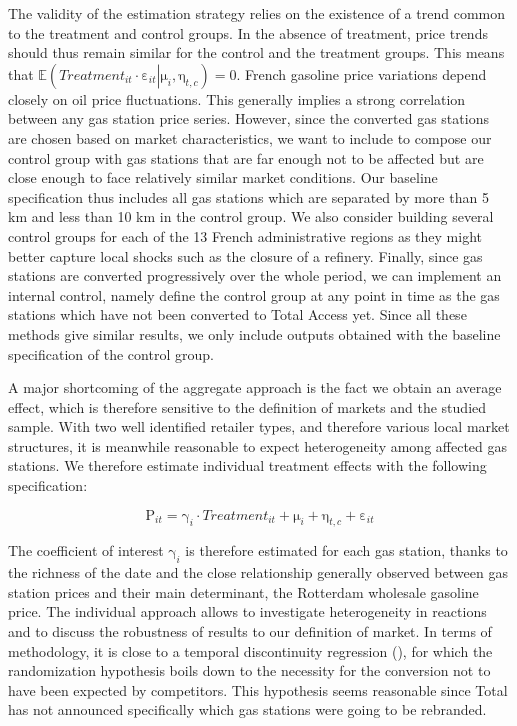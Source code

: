 \documentclass[english]{article}
\begin{document}
The validity of the estimation strategy relies on the existence of a trend common to the treatment and control groups. In the absence of treatment, price trends should thus remain similar for the control and the treatment groups. This means that
$\mathbb{E}\left(Treatment_{it}\cdot\mathrm{\varepsilon}_{it}\left|\mathrm{\mu}_{i},\mathrm{\eta}_{t,c}\right.\right)=0$. French gasoline price variations depend closely on oil price fluctuations. This generally implies a strong correlation between any gas station price series. However, since the converted gas stations are chosen based on market characteristics, we want to include to compose our control group with gas stations that are far enough not to be affected but are close enough to face relatively similar market conditions. Our baseline specification thus includes all gas stations which are separated by more than 5 km and less than 10 km in the control group. We also consider building several control groups for each of the 13 French administrative regions as they might better capture local shocks such as the closure of a refinery. Finally, since gas stations are converted progressively over the whole period, we can implement an internal control, namely define the control group at any point in time as the gas stations which have not been converted to Total Access yet. Since all these methods give similar results, we only include outputs obtained with the baseline specification of the control group.

A major shortcoming of the aggregate approach is the fact we obtain an average effect, which is therefore sensitive to the definition of markets and the studied sample. With two well identified retailer types, and therefore various local market structures, it is meanwhile reasonable to expect heterogeneity among affected gas stations. We therefore estimate individual treatment effects with the following specification:

\begin{equation}
\mathrm{P}_{it}=\mathrm{\gamma}_{i}\cdot Treatment_{it}+\mathrm{\mu}_{i}+\mathrm{\eta}_{t,c}+\mathrm{\varepsilon}_{it}\label{eq:2}
\end{equation}

The coefficient of interest $\mathrm{\gamma}_{i}$ is therefore estimated for each gas station, thanks to the richness of the date and the close relationship generally observed between gas station prices and their main determinant, the Rotterdam wholesale gasoline price. The individual approach allows to investigate heterogeneity in reactions and to discuss the robustness of results to our definition of market. In terms of methodology, it is close to a temporal discontinuity regression (\cite{AUF11}), for which the randomization hypothesis boils down to the necessity for the conversion not to have been expected by competitors. This hypothesis seems reasonable since Total has not announced specifically which gas stations were going to be rebranded.
\end{document}
